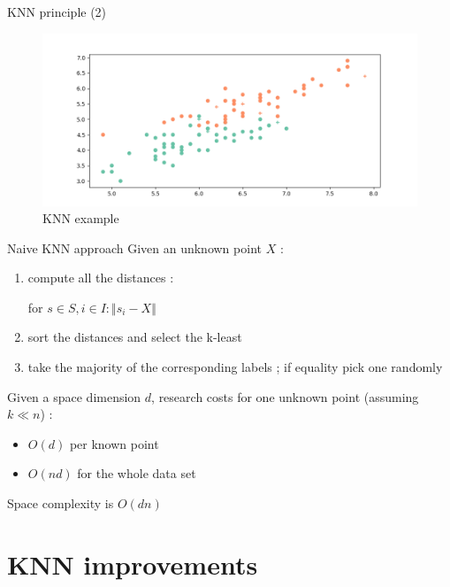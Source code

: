 \documentclass[11 pt]{beamer}
\begin{document}

\begin{frame}{KNN principle (2)}
\begin{figure}
	\centering
	\includegraphics[width=\textwidth]{figures/irisClass2_1.png}
	\caption{KNN example}
	\label{fig:iris2}
\end{figure}
\end{frame}
%

\begin{frame}{Naive KNN approach}
Given an unknown point $X$ :
\begin{enumerate}
	\item compute all the distances :

	for $s \in S, i \in I :\Vert s_i - X\Vert$

	\item sort the distances and select the k-least

	\item take the majority of the corresponding labels ; if equality pick one randomly
\end{enumerate}

Given a space dimension $d$, research costs for one unknown point (assuming $k \ll n$) :

\begin{itemize}
	\item $O(d)$ per known point
	\item $O(nd)$ for the whole data set
\end{itemize}

Space complexity is $O(dn)$
\end{frame}
%
\section{KNN improvements}
\end{document}
